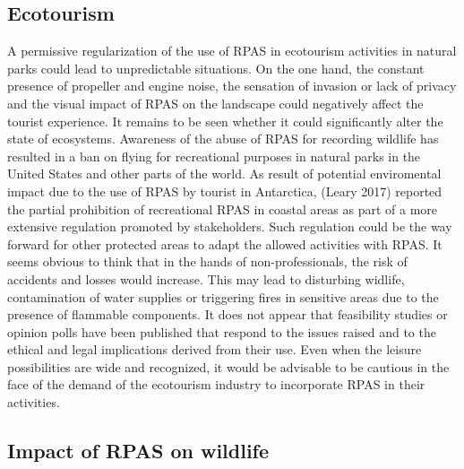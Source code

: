 \documentclass[]{interact}
\theoremstyle{plain}%
\theoremstyle{definition}
\theoremstyle{remark}
\begin{document}
\subsection{Ecotourism}\label{ecotourism-1}

A permissive regularization of the use of RPAS in ecotourism activities
in natural parks could lead to unpredictable situations. On the one
hand, the constant presence of propeller and engine noise, the sensation
of invasion or lack of privacy and the visual impact of RPAS on the
landscape could negatively affect the tourist experience. It remains to
be seen whether it could significantly alter the state of ecosystems.
Awareness of the abuse of RPAS for recording wildlife has resulted in a
ban on flying for recreational purposes in natural parks in the United
States and other parts of the world. As result of potential enviromental
impact due to the use of RPAS by tourist in Antarctica, (Leary 2017)
reported the partial prohibition of recreational RPAS in coastal areas
as part of a more extensive regulation promoted by stakeholders. Such
regulation could be the way forward for other protected areas to adapt
the allowed activities with RPAS. It seems obvious to think that in the
hands of non-professionals, the risk of accidents and losses would
increase. This may lead to disturbing widlife, contamination of water
supplies or triggering fires in sensitive areas due to the presence of
flammable components. It does not appear that feasibility studies or
opinion polls have been published that respond to the issues raised and
to the ethical and legal implications derived from their use. Even when
the leisure possibilities are wide and recognized, it would be advisable
to be cautious in the face of the demand of the ecotourism industry to
incorporate RPAS in their activities.

\subsection{Impact of RPAS on
wildlife}\label{impact-of-rpas-on-wildlife-1}
\end{document}
